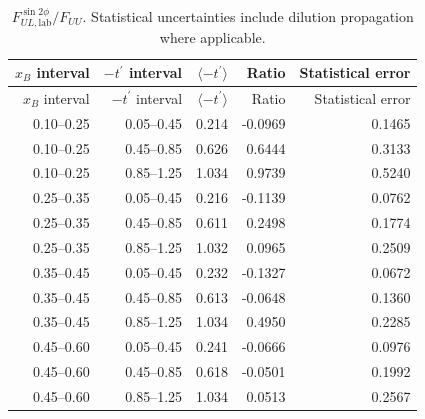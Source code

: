 \begin{longtable}{rrrrr}
\caption{$F_{UL,\mathrm{lab}}^{\sin2\phi}/F_{UU}$. Statistical uncertainties include dilution propagation where applicable.}\label{tab:release_ul2}\\
\toprule
$x_B$ interval & $-t^\prime$ interval & $\langle-t^\prime\rangle$ & Ratio & Statistical error\\
\midrule\endfirsthead
\toprule $x_B$ interval & $-t^\prime$ interval & $\langle-t^\prime\rangle$ & Ratio & Statistical error\\\midrule\endhead
0.10--0.25 & 0.05--0.45 & 0.214 & -0.0969 & 0.1465\\
0.10--0.25 & 0.45--0.85 & 0.626 & 0.6444 & 0.3133\\
0.10--0.25 & 0.85--1.25 & 1.034 & 0.9739 & 0.5240\\
0.25--0.35 & 0.05--0.45 & 0.216 & -0.1139 & 0.0762\\
0.25--0.35 & 0.45--0.85 & 0.611 & 0.2498 & 0.1774\\
0.25--0.35 & 0.85--1.25 & 1.032 & 0.0965 & 0.2509\\
0.35--0.45 & 0.05--0.45 & 0.232 & -0.1327 & 0.0672\\
0.35--0.45 & 0.45--0.85 & 0.613 & -0.0648 & 0.1360\\
0.35--0.45 & 0.85--1.25 & 1.034 & 0.4950 & 0.2285\\
0.45--0.60 & 0.05--0.45 & 0.241 & -0.0666 & 0.0976\\
0.45--0.60 & 0.45--0.85 & 0.618 & -0.0501 & 0.1992\\
0.45--0.60 & 0.85--1.25 & 1.034 & 0.0513 & 0.2567\\
\bottomrule
\end{longtable}
